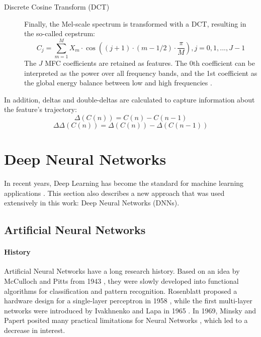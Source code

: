 \begin{description}
            \item[Discrete Cosine Transform (DCT)] Finally, the Mel-scale spectrum is transformed with a DCT, resulting in the so-called cepstrum:
            \begin{equation}
                C_j = \sum_{m=1}^{M} X_m \cdot \cos \left( (j+1) \cdot (m-1/2) \cdot \frac{\pi}{M} \right), j=0,1,...,J-1
            \end{equation}
            The $J$ MFC coefficients are retained as features. 
            The 0th coefficient can be interpreted as the power over all frequency bands, and the 1st coefficient as the global energy balance between low and high frequencies \cite{oshaughnessy}.
        \end{description}

        In addition, deltas and double-deltas are calculated to capture information about the feature's trajectory:
        \begin{equation}
            \Delta(C(n)) = C(n) - C(n-1) 
        \end{equation}
        \begin{equation}
            \Delta\Delta(C(n)) = \Delta(C(n)) - \Delta(C(n-1))
        \end{equation}

    \section{Deep Neural Networks} \label{sec:dnn}
        In recent years, Deep Learning has become the standard for machine learning applications \cite{schmidhuber_dl}. 
        This section also describes a new approach that was used extensively in this work: Deep Neural Networks (DNNs).

        \subsection{Artificial Neural Networks}
            \paragraph{History} Artificial Neural Networks have a long research history. 
            Based on an idea by McCulloch and Pitts from 1943 \cite{mcculloch_pitts}, they were slowly developed into functional algorithms for classification and pattern recognition. 
            Rosenblatt proposed a hardware design for a single-layer perceptron in 1958 \cite{rosenblatt}, while the first multi-layer networks were introduced by Ivakhnenko and Lapa in 1965 \cite{ivakhnenko}. 
            In 1969, Minsky and Papert posited many practical limitations for Neural Networks \cite{minsky_papert}, which led to a decrease in interest.


